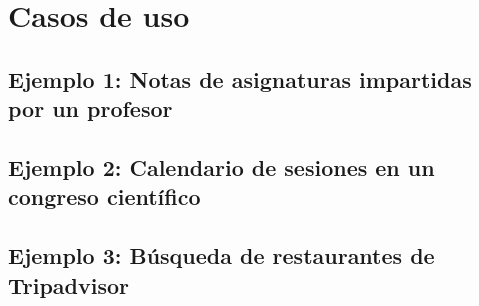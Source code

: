 \chapter{Casos de uso}

\section{Ejemplo 1: Notas de asignaturas impartidas por un profesor}

\section{Ejemplo 2: Calendario de sesiones en un congreso científico}

\section{Ejemplo 3: Búsqueda de restaurantes de Tripadvisor}